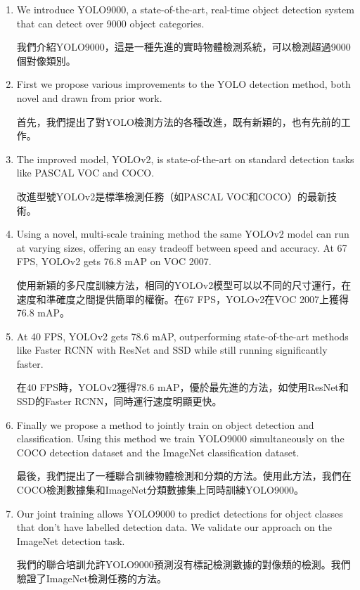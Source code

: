 \begin{enumerate}
\item We introduce YOLO9000, a state-of-the-art, real-time object detection system that can detect over 9000 object categories. 

我們介紹YOLO9000，這是一種先進的實時物體檢測系統，可以檢測超過9000個對像類別。


\item First we propose various improvements to the YOLO detection method, both novel and drawn from prior work. 

首先，我們提出了對YOLO檢測方法的各種改進，既有新穎的，也有先前的工作。


\item The improved model, YOLOv2, is state-of-the-art on standard detection tasks like PASCAL VOC and COCO. 

改進型號YOLOv2是標準檢測任務（如PASCAL VOC和COCO）的最新技術。


\item Using a novel, multi-scale training method the same YOLOv2 model can run at varying sizes, offering an easy tradeoff between speed and accuracy. At 67 FPS, YOLOv2 gets 76.8 mAP on VOC 2007. 

使用新穎的多尺度訓練方法，相同的YOLOv2模型可以以不同的尺寸運行，在速度和準確度之間提供簡單的權衡。在67 FPS，YOLOv2在VOC 2007上獲得76.8 mAP。


\item At 40 FPS, YOLOv2 gets 78.6 mAP, outperforming state-of-the-art methods like Faster RCNN with ResNet and SSD while still running significantly faster. 

在40 FPS時，YOLOv2獲得78.6 mAP，優於最先進的方法，如使用ResNet和SSD的Faster RCNN，同時運行速度明顯更快。


\item Finally we propose a method to jointly train on object detection and classification. Using this method we train YOLO9000 simultaneously on the COCO detection dataset and the ImageNet classification dataset. 

最後，我們提出了一種聯合訓練物體檢測和分類的方法。使用此方法，我們在COCO檢測數據集和ImageNet分類數據集上同時訓練YOLO9000。


\item Our joint training allows YOLO9000 to predict detections for object classes that don’t have labelled detection data. We validate our approach on the ImageNet detection task. 

我們的聯合培訓允許YOLO9000預測沒有標記檢測數據的對像類的檢測。我們驗證了ImageNet檢測任務的方法。



\end{enumerate}
